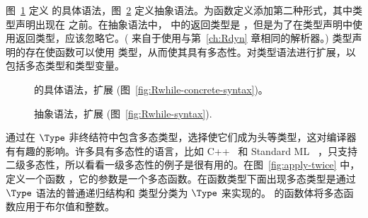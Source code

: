\documentclass[11pt]{book}
\newcommand{\gray}[1]{{\color{gray} #1}}
\begin{document}
图~\ref{fig:Rpoly-concrete-syntax} 定义
\LangPoly{} 的具体语法，图~\ref{fig:Rpoly-syntax} 定义抽象语法。为函数定义添加第二种形式，其中类型声明出现在  之前。在抽象语法中，  中的返回类型是 ，但是为了在类型声明中使用返回类型，应该忽略它。(
 来自于使用与第~\ref{ch:Rdyn} 章相同的解析器。)  类型声明的存在使函数可以使用  类型，从而使其具有多态性。对类型语法进行扩展，以包括多态类型和类型变量。

\begin{figure}[tp]
\centering
\fbox{
  \begin{minipage}{0.96\textwidth}
\small
\[
\begin{array}{lcl}
  \Type &::=& \ldots \mid \LP\key{All}~\LP\Var\ldots\RP~ \Type\RP \mid \Var \\
  \Def &::=& \gray{ \CDEF{\Var}{\LS\Var \key{:} \Type\RS \ldots}{\Type}{\Exp} } \\
   &\mid& \LP\key{:}~\Var~\Type\RP \\
   &&       \LP\key{define}~ \LP\Var ~ \Var\ldots\RP ~ \Exp\RP  \\
  \LangPoly{} &::=& \gray{ \Def \ldots ~ \Exp }
\end{array}
\]
\end{minipage}
}
\caption{ \LangPoly{} 的具体语法，扩展 \LangLoop{}
    (图~\ref{fig:Rwhile-concrete-syntax})。}
\label{fig:Rpoly-concrete-syntax}
\end{figure}

\begin{figure}[tp]
\centering
\fbox{
  \begin{minipage}{0.96\textwidth}
\small
\[
\begin{array}{lcl}
  \Type &::=& \ldots \mid \LP\key{All}~\LP\Var\ldots\RP~ \Type\RP \mid \Var \\
  \Def &::=& \gray{ \DEF{\Var}{\LP\LS\Var \key{:} \Type\RS \ldots\RP}{\Type}{\code{'()}}{\Exp} } \\
   &\mid& \DECL{\Var}{\Type} \\
   &&  \DEF{\Var}{\LP\Var \ldots\RP}{\key{'Any}}{\code{'()}}{\Exp}  \\
  \LangPoly{} &::=& \gray{ \PROGRAMDEFSEXP{\code{'()}}{\LP\Def\ldots\RP}{\Exp} }
\end{array}
\]
\end{minipage}
}
\caption{ \LangPoly{} 抽象语法，扩展 \LangLoop{}
    (图~\ref{fig:Rwhile-syntax}).}
\label{fig:Rpoly-syntax}
\end{figure}

通过在 $\Type$ 非终结符中包含多态类型，选择使它们成为头等类型，这对编译器有有趣的影响。许多具有多态性的语言，比如
C++~\citep{stroustrup88:_param_types} 和 Standard
ML~\citep{Milner:1990fk} ，只支持二级多态性，所以看看一级多态性的例子是很有用的。在图~\ref{fig:apply-twice} 中，定义一个函数 
，它的参数是一个多态函数。在函数类型下面出现多态类型是通过 $\Type$ 语法的普通递归结构和  类型分类为 $\Type$ 来实现的。  的函数体将多态函数应用于布尔值和整数。
\end{document}
